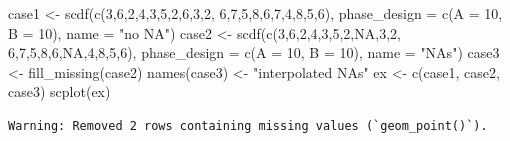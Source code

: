\documentclass[
  letterpaper,
  DIV=11,
  numbers=noendperiod]{scrreprt}
\newenvironment{Shaded}{\begin{snugshade}}{\end{snugshade}}
\newcommand{\AttributeTok}[1]{\textcolor[rgb]{0.40,0.45,0.13}{#1}}
\newcommand{\ConstantTok}[1]{\textcolor[rgb]{0.56,0.35,0.01}{#1}}
\newcommand{\DecValTok}[1]{\textcolor[rgb]{0.68,0.00,0.00}{#1}}
\newcommand{\FunctionTok}[1]{\textcolor[rgb]{0.28,0.35,0.67}{#1}}
\newcommand{\NormalTok}[1]{\textcolor[rgb]{0.00,0.23,0.31}{#1}}
\newcommand{\OtherTok}[1]{\textcolor[rgb]{0.00,0.23,0.31}{#1}}
\newcommand{\StringTok}[1]{\textcolor[rgb]{0.13,0.47,0.30}{#1}}
\begin{document}
\begin{Shaded}
\begin{Highlighting}[]
\NormalTok{case1 }\OtherTok{\textless{}{-}} \FunctionTok{scdf}\NormalTok{(}\FunctionTok{c}\NormalTok{(}\DecValTok{3}\NormalTok{,}\DecValTok{6}\NormalTok{,}\DecValTok{2}\NormalTok{,}\DecValTok{4}\NormalTok{,}\DecValTok{3}\NormalTok{,}\DecValTok{5}\NormalTok{,}\DecValTok{2}\NormalTok{,}\DecValTok{6}\NormalTok{,}\DecValTok{3}\NormalTok{,}\DecValTok{2}\NormalTok{, }\DecValTok{6}\NormalTok{,}\DecValTok{7}\NormalTok{,}\DecValTok{5}\NormalTok{,}\DecValTok{8}\NormalTok{,}\DecValTok{6}\NormalTok{,}\DecValTok{7}\NormalTok{,}\DecValTok{4}\NormalTok{,}\DecValTok{8}\NormalTok{,}\DecValTok{5}\NormalTok{,}\DecValTok{6}\NormalTok{), }
              \AttributeTok{phase\_design =} \FunctionTok{c}\NormalTok{(}\AttributeTok{A =} \DecValTok{10}\NormalTok{, }\AttributeTok{B =} \DecValTok{10}\NormalTok{), }\AttributeTok{name =} \StringTok{"no NA"}\NormalTok{)}
\NormalTok{case2 }\OtherTok{\textless{}{-}} \FunctionTok{scdf}\NormalTok{(}\FunctionTok{c}\NormalTok{(}\DecValTok{3}\NormalTok{,}\DecValTok{6}\NormalTok{,}\DecValTok{2}\NormalTok{,}\DecValTok{4}\NormalTok{,}\DecValTok{3}\NormalTok{,}\DecValTok{5}\NormalTok{,}\DecValTok{2}\NormalTok{,}\ConstantTok{NA}\NormalTok{,}\DecValTok{3}\NormalTok{,}\DecValTok{2}\NormalTok{, }\DecValTok{6}\NormalTok{,}\DecValTok{7}\NormalTok{,}\DecValTok{5}\NormalTok{,}\DecValTok{8}\NormalTok{,}\DecValTok{6}\NormalTok{,}\ConstantTok{NA}\NormalTok{,}\DecValTok{4}\NormalTok{,}\DecValTok{8}\NormalTok{,}\DecValTok{5}\NormalTok{,}\DecValTok{6}\NormalTok{), }
              \AttributeTok{phase\_design =} \FunctionTok{c}\NormalTok{(}\AttributeTok{A =} \DecValTok{10}\NormalTok{, }\AttributeTok{B =} \DecValTok{10}\NormalTok{), }\AttributeTok{name =} \StringTok{"NAs"}\NormalTok{)}
\NormalTok{case3 }\OtherTok{\textless{}{-}} \FunctionTok{fill\_missing}\NormalTok{(case2)}
\FunctionTok{names}\NormalTok{(case3) }\OtherTok{\textless{}{-}} \StringTok{"interpolated NAs"}
\NormalTok{ex }\OtherTok{\textless{}{-}} \FunctionTok{c}\NormalTok{(case1, case2, case3)}
\FunctionTok{scplot}\NormalTok{(ex)}
\end{Highlighting}
\end{Shaded}

\begin{verbatim}
Warning: Removed 2 rows containing missing values (`geom_point()`).
\end{verbatim}
\end{document}
